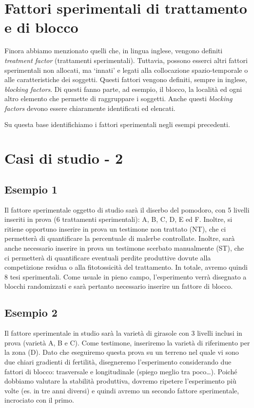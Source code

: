 \documentclass[a4paper,12pt,oneside]{book}
\theoremstyle{definition}
\theoremstyle{definition}
\theoremstyle{definition}
\theoremstyle{remark}
\begin{document}
\section{Fattori sperimentali di trattamento e di
blocco}\label{fattori-sperimentali-di-trattamento-e-di-blocco}

Finora abbiamo menzionato quelli che, in lingua inglese, vengono
definiti \emph{treatment factor} (trattamenti sperimentali). Tuttavia,
possono esserci altri fattori sperimentali non allocati, ma `innati' e
legati alla collocazione spazio-temporale o alle caratteristiche dei
soggetti. Questi fattori vengono definiti, sempre in inglese,
\emph{blocking factors}. Di questi fanno parte, ad esempio, il blocco,
la località ed ogni altro elemento che permette di raggruppare i
soggetti. Anche questi \emph{blocking factors} devono essere chiaramente
identificati ed elencati.

Su questa base identifichiamo i fattori sperimentali negli esempi
precedenti.

\section{Casi di studio - 2}\label{casi-di-studio---2}

\subsection{Esempio 1}\label{esempio-1}

Il fattore sperimentale oggetto di studio sarà il diserbo del pomodoro,
con 5 livelli inseriti in prova (6 trattamenti sperimentali): A, B, C,
D, E ed F. Inoltre, si ritiene opportuno inserire in prova un testimone
non trattato (NT), che ci permetterà di quantificare la percentuale di
malerbe controllate. Inoltre, sarà anche necessario inserire in prova un
testimone scerbato manualmente (ST), che ci permetterà di quantificare
eventuali perdite produttive dovute alla competizione residua o alla
fitotossicità del trattamento. In totale, avremo quindi 8 tesi
sperimentali. Come usuale in pieno campo, l'esperimento verrà disegnato
a blocchi randomizzati e sarà pertanto necessario inserire un fattore di
blocco.

\subsection{Esempio 2}\label{esempio-2}

Il fattore sperimentale in studio sarà la varietà di girasole con 3
livelli inclusi in prova (varietà A, B e C). Come testimone, inseriremo
la varietà di riferimento per la zona (D). Dato che eseguiremo questa
prova su un terreno nel quale vi sono due chiari gradienti di fertilità,
disegneremo l'esperimento considerando due fattori di blocco:
trasversale e longitudinale (spiego meglio tra poco\ldots{}). Poiché
dobbiamo valutare la stabilità produttiva, dovremo ripetere
l'esperimento più volte (es. in tre anni diversi) e quindi avremo un
secondo fattore sperimentale, incrociato con il primo.
\end{document}

